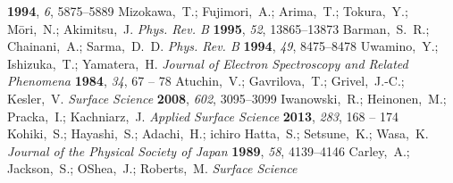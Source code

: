 \documentclass[aip,graphicx,numerical]{revtex4-1}
\begin{document}
\begin{mcitethebibliography}{33}
  \textbf{1994}, \emph{6}, 5875--5889\relax
\mciteBstWouldAddEndPuncttrue
\mciteSetBstMidEndSepPunct{\mcitedefaultmidpunct}
{\mcitedefaultendpunct}{\mcitedefaultseppunct}\relax
\EndOfBibitem
{}
Mizokawa,~T.; Fujimori,~A.; Arima,~T.; Tokura,~Y.; M{\={o}}ri,~N.; Akimitsu,~J.
  \emph{Phys. Rev. B} \textbf{1995}, \emph{52}, 13865--13873\relax
\mciteBstWouldAddEndPuncttrue
\mciteSetBstMidEndSepPunct{\mcitedefaultmidpunct}
{\mcitedefaultendpunct}{\mcitedefaultseppunct}\relax
\EndOfBibitem
{}
Barman,~S.~R.; Chainani,~A.; Sarma,~D.~D. \emph{Phys. Rev. B} \textbf{1994},
  \emph{49}, 8475--8478\relax
\mciteBstWouldAddEndPuncttrue
\mciteSetBstMidEndSepPunct{\mcitedefaultmidpunct}
{\mcitedefaultendpunct}{\mcitedefaultseppunct}\relax
\EndOfBibitem
{}
Uwamino,~Y.; Ishizuka,~T.; Yamatera,~H. \emph{Journal of Electron Spectroscopy
  and Related Phenomena} \textbf{1984}, \emph{34}, 67 -- 78\relax
\mciteBstWouldAddEndPuncttrue
\mciteSetBstMidEndSepPunct{\mcitedefaultmidpunct}
{\mcitedefaultendpunct}{\mcitedefaultseppunct}\relax
\EndOfBibitem
{}
Atuchin,~V.; Gavrilova,~T.; Grivel,~J.-C.; Kesler,~V. \emph{Surface Science}
  \textbf{2008}, \emph{602}, 3095--3099\relax
\mciteBstWouldAddEndPuncttrue
\mciteSetBstMidEndSepPunct{\mcitedefaultmidpunct}
{\mcitedefaultendpunct}{\mcitedefaultseppunct}\relax
\EndOfBibitem
{}
Iwanowski,~R.; Heinonen,~M.; Pracka,~I.; Kachniarz,~J. \emph{Applied Surface
  Science} \textbf{2013}, \emph{283}, 168 -- 174\relax
\mciteBstWouldAddEndPuncttrue
\mciteSetBstMidEndSepPunct{\mcitedefaultmidpunct}
{\mcitedefaultendpunct}{\mcitedefaultseppunct}\relax
\EndOfBibitem
{}
Kohiki,~S.; Hayashi,~S.; Adachi,~H.; ichiro Hatta,~S.; Setsune,~K.; Wasa,~K.
  \emph{Journal of the Physical Society of Japan} \textbf{1989}, \emph{58},
  4139--4146\relax
\mciteBstWouldAddEndPuncttrue
\mciteSetBstMidEndSepPunct{\mcitedefaultmidpunct}
{\mcitedefaultendpunct}{\mcitedefaultseppunct}\relax
\EndOfBibitem
{}
Carley,~A.; Jackson,~S.; OShea,~J.; Roberts,~M. \emph{Surface Science}

\end{mcitethebibliography}
\end{document}
